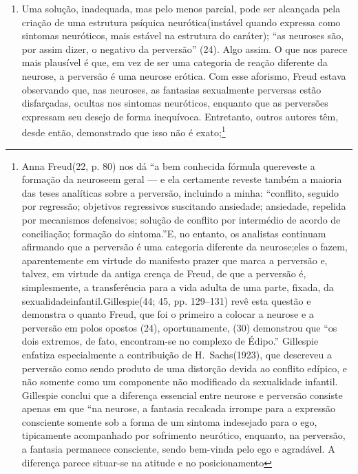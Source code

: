 \begin{enumerate}
\item Uma solução, inadequada, mas pelo menos parcial, pode ser
alcançada pela criação de uma estrutura psíquica neurótica\idxpervneuro[|(] (instável
quando expressa como sintomas\idxsinto{} neuróticos, mais estável na estrutura do
caráter); ``as neuroses são, por assim dizer, o negativo
da perversão'' (24). Algo assim. O que nos parece mais
plausível é que, em vez de ser uma categoria de reação diferente da
neurose, a perversão é uma neurose erótica. Com esse aforismo, Freud
estava observando que, nas neuroses, as fantasias sexualmente perversas
estão disfarçadas, ocultas nos sintomas neuróticos, enquanto que as
perversões expressam seu desejo de forma inequívoca. Entretanto, outros
autores têm, desde então, demonstrado que isso não é exato;\footnote{ Anna Freud\idxannaf[|nn] (22, p. 80) nos dá
``a bem conhecida fórmula que\idxfreudperve[|nn] reveste a formação da neurose\idxfreudneuro[|nn] em geral --- e ela
certamente reveste também a maioria das teses analíticas sobre a
perversão, incluindo a minha: ``conflito, seguido por
regressão; objetivos regressivos suscitando ansiedade; ansiedade,
repelida por mecanismos defensivos; solução de conflito por intermédio
de acordo de conciliação; formação do sintoma.''\idxsinto[|nn] E, no
entanto, os analistas continuam afirmando que a perversão é uma
categoria diferente da neurose;\idxneuro[|nn] eles o fazem, aparentemente em virtude
do manifesto prazer que marca a perversão e, talvez, em virtude da
antiga crença de Freud, de que a perversão é, simplesmente, a
transferência para a vida adulta de uma parte, fixada, da sexualidade\idxsexui[|nn]
infantil.\idxinfansexua[|nn] Gillespie\idxgille[|nn] (44; 45, pp. 129--131) revê esta questão e demonstra
o quanto Freud, que foi o primeiro a colocar a neurose e a perversão em
polos opostos (24), oportunamente, (30) demonstrou que
``os dois extremos, de fato, encontram-se no complexo de
Édipo.'' Gillespie enfatiza especialmente a contribuição
de H.~Sachs\idxsachs[|nn] (1923), que descreveu a perversão como sendo produto de uma
distorção devida ao conflito edípico, e não somente como um componente
não modificado da sexualidade infantil. Gillespie conclui que a
diferença essencial entre neurose e perversão consiste apenas em que
``na neurose, a fantasia recalcada irrompe para a
expressão consciente somente sob a forma de um sintoma indesejado para
o ego, tipicamente acompanhado por sofrimento neurótico, enquanto, na
perversão, a fantasia permanece consciente, sendo bem-vinda pelo ego e
agradável. A diferença parece situar-se na atitude e no posicionamento
}
\end{enumerate}
